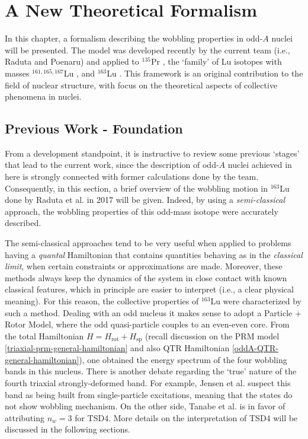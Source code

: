 \chapter{A New Theoretical Formalism}
\label{chapter-6-aw1-formalism}

In this chapter, a formalism describing the wobbling properties in odd-$A$ nuclei will be presented. The model was developed recently by the current team (i.e., Raduta and Poenaru) and applied to $^{135}$Pr \cite{raduta2020new}, the `family' of Lu isotopes with masses $^{161,165,167}$Lu \cite{raduta2020approach}, and $^{163}$Lu \cite{raduta2020approach,raduta2020towards,poenaru2021parity,poenaru2021extensive1,poenaru2021extensive2}. This framework is an original contribution to the field of nuclear structure, with focus on the theoretical aspects of collective phenomena in nuclei.

\section{Previous Work - Foundation}
\label{foundation}

From a development standpoint, it is instructive to review some previous `stages' that lead to the current work, since the description of odd-$A$ nuclei achieved in here is strongly connected with former calculations done by the team. Consequently, in this section, a brief overview of the wobbling motion in $^{163}$Lu done by Raduta et al. in 2017 \cite{raduta2017semiclassical} will be given. Indeed, by using a \emph{semi-classical} approach, the wobbling properties of this odd-mass isotope were accurately described.

The semi-classical approaches tend to be very useful when applied to problems having a \emph{quantal} Hamiltonian that contains quantities behaving as in the \emph{classical limit}, when certain constraints or approximations are made. Moreover, these methods always keep the dynamics of the system in close contact with known classical features, which in principle are easier to interpret (i.e., a clear physical meaning). For this reason, the collective properties of $^{163}$Lu were characterized by such a method. Dealing with an odd nucleus it makes sense to adopt a Particle + Rotor Model, where the odd quasi-particle couples to an even-even core. From the total Hamiltonian $H=H_\text{rot}+H_\text{sp}$ (recall discussion on the PRM model \ref{triaxial-prm-general-hamiltonian} and also QTR Hamiltonian \ref{oddA-QTR-general-hamiltonian}), one obtained the energy spectrum of the four wobbling bands in this nucleus. There is another debate regarding the `true' nature of the fourth triaxial strongly-deformed band. For example, Jensen et al. \cite{jensen2004coexisting} suspect this band as being built from single-particle excitations, meaning that the states do not show wobbling mechanism. On the other side, Tanabe et al. \cite{tanabe2008selection} is in favor of attributing $n_w=3$ for TSD4. More details on the interpretation of TSD4 will be discussed in the following sections.

